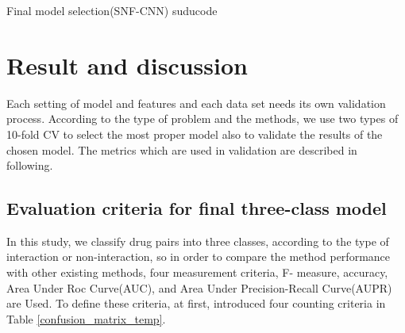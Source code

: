 \documentclass{bmcart}
\begin{document}
\renewcommand{\algorithmicrequire}{\textbf{Input:}}
\renewcommand{\algorithmicensure}{\textbf{Output:}}
\begin{algorithm}[!h]
\caption{Final model selection(SNF-CNN) suducode}
\label{SNFCNNSuducode}
\end{algorithm}


\section*{Result and discussion}

Each setting of model and features and each data set needs its own validation process. According to the type of problem and the methods, we use two types of 10-fold CV to select the most proper model also to validate the results of the chosen model. The metrics which are used in validation are described in following.

\subsection*{Evaluation criteria for final three-class model}
In this study, we classify drug pairs into three classes, according to the type of interaction or non-interaction, so in order to compare the method performance with other existing methods, four measurement criteria, F- measure, accuracy, Area Under Roc Curve(AUC), and Area Under Precision-Recall Curve(AUPR) are Used. To define these criteria, at first, introduced four counting criteria in Table
\ref{confusion_matrix_temp}.
\end{document}
